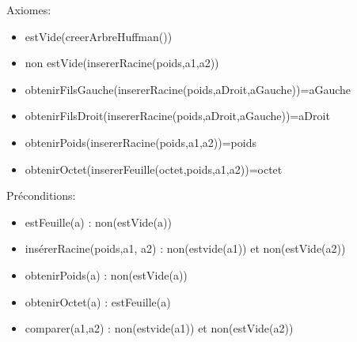 \documentclass{article}
\begin{document}
    
    Axiomes: \begin{itemize}[label=$\- $, leftmargin=2cm, itemsep=0cm]
        
        \item estVide(creerArbreHuffman())
        \item non estVide(insererRacine(poids,a1,a2))
        \item obtenirFilsGauche(insererRacine(poids,aDroit,aGauche))=aGauche
        \item obtenirFilsDroit(insererRacine(poids,aDroit,aGauche))=aDroit
        \item obtenirPoids(insererRacine(poids,a1,a2))=poids
        \item obtenirOctet(insererFeuille(octet,poids,a1,a2))=octet
         
    \end{itemize}
    Préconditions: \begin{itemize}[label=$\- $, leftmargin=2cm, itemsep=0cm]
        \item estFeuille(a) : non(estVide(a))
        \item insérerRacine(poids,a1, a2) : non(estvide(a1)) et non(estVide(a2))
        \item obtenirPoids(a) : non(estVide(a))
        \item obtenirOctet(a) : estFeuille(a)
        \item comparer(a1,a2) : non(estvide(a1)) et non(estVide(a2))
    \end{itemize}
\end{document}
